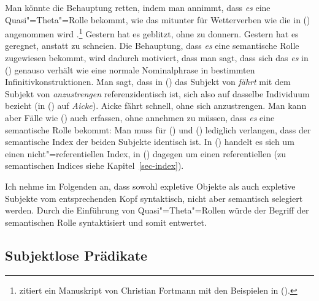 \noindent
Man könnte die Behauptung retten, indem man annimmt, dass \emph{es} eine
Quasi"=Theta"=Rolle bekommt, wie das mitunter für
Wetterverben wie die in () angenommen wird
  \citep[--327]{Chomsky93a}\nocite{Chomsky81a}.\footnote{ 
  \citet{Berman99a} zitiert ein Manuskript von Christian Fortmann 
  mit den Beispielen in ().%
}
\eal
\ex Gestern hat es geblitzt, ohne zu donnern.
\ex Gestern hat es geregnet, anstatt zu schneien.
\zl
Die Behauptung, dass \emph{es} eine semantische Rolle zugewiesen bekommt, wird dadurch
motiviert, dass man sagt, dass sich das \emph{es} in () genauso verhält wie eine
normale Nominalphrase in bestimmten Infinitivkonstruktionen.
Man sagt, dass in () das Subjekt von \emph{fährt} mit dem Subjekt von \emph{anzustrengen}
referenzidentisch ist, sich also auf dasselbe Individuum bezieht (in () auf \emph{Aicke}).
\ea
Aicke fährt schnell, ohne sich anzustrengen.
\z
Man kann aber Fälle wie () auch erfassen, ohne annehmen
zu müssen, dass \emph{es} eine semantische Rolle bekommt: Man muss für () und ()
lediglich verlangen, dass der semantische Index der beiden
Subjekte identisch ist. In () handelt es sich um einen
nicht"=referentiellen Index, in () dagegen um einen referentiellen 
(zu semantischen Indices siehe Kapitel~\ref{sec-index}).

Ich nehme im Folgenden an, dass sowohl expletive Objekte als auch expletive Subjekte
vom entsprechenden Kopf syntaktisch, nicht aber semantisch selegiert werden.
Durch die Einführung von Quasi"=Theta"=Rollen würde der Begriff der semantischen Rolle 
syntaktisiert\label{page-syntaktisierung} und somit entwertet.

\subsection{Subjektlose Prädikate}
\label{sec-subjekt-valenz}


